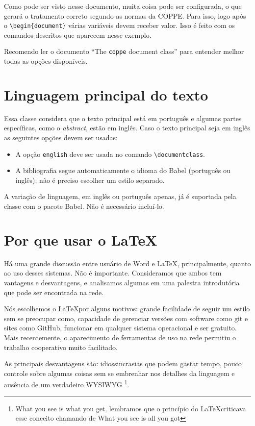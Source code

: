 \documentclass[dsc,pdfa]{coppe}
\begin{document}
   Como pode ser visto nesse documento, muita coisa pode ser configurada, o que gerará o tratamento correto segundo as normas da COPPE. Para isso, logo após o \verb|\begin{document}| várias variáveis devem receber valor. Isso é feito com os comandos descritos que aparecem nesse exemplo.

   Recomendo ler o documento ``The \verb*|coppe| document class'' para entender melhor todas as opções disponíveis.

\section{Linguagem principal do texto}

  Essa classe considera que o texto principal está em português e algumas partes específicas, como o \textit{abstract}, estão em inglês. Caso o texto principal seja em inglês as seguintes opções devem ser usadas:
 \begin{itemize}
 \item A opção \verb|english| deve ser usada no comando \verb|\documentclass|.
 \item A bibliografia segue automaticamente o idioma do Babel (português ou inglês); não é preciso escolher um estilo separado.
 \end{itemize}

  A variação de linguagem, em inglês ou português apenas, já é suportada pela classe \CoppeTeX  com o pacote Babel. Não é necessário incluí-lo.

\section{Por que usar o \LaTeX}

  Há uma grande discussão entre usuário de Word e \LaTeX, principalmente, quanto ao uso desses sistemas. Não é importante. Consideramos que ambos tem vantagens e desvantagens, e analisamos algumas em uma palestra introdutória que pode ser encontrada na rede.

  Nós escolhemos o \LaTeX por alguns motivos: grande facilidade de seguir um estilo sem se preocupar como, capacidade de gerenciar versões com software como git e sites como GitHub, funcionar em qualquer sistema operacional e  ser gratuito. Mais recentemente, o aparecimento de ferramentas de uso na rede permitiu o trabalho cooperativo muito facilitado.

  As principais desvantagens são: idiossincrasias que podem gastar tempo, pouco controle sobre algumas coisas sem se embrenhar nos detalhes da linguagem e ausência de um verdadeiro WYSIWYG \footnote{What you see is what you get, lembramos que o princípio do \LaTeX criticava esse conceito chamando de What you see is all you got}.
\end{document}
